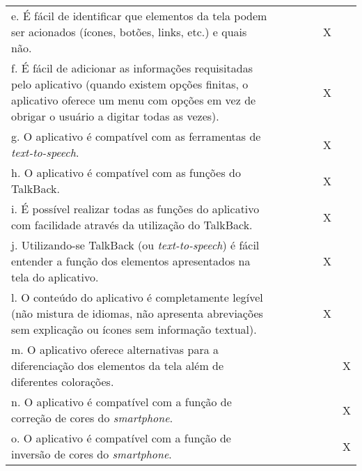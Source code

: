 \documentclass[portuguese,oneside]{tcc}
\begin{document}
\begin{center}
\begin{longtabu}{|L{25em}|c|c|c|c|c|c|}
	e. É fácil de identificar que elementos da tela podem ser acionados (ícones, botões, links, etc.) e quais não. & & & & & X & \\ 
	f. É fácil de adicionar as informações requisitadas pelo aplicativo (quando existem opções finitas, o aplicativo oferece um menu com opções em vez de obrigar o usuário a digitar todas as vezes). & & & & & X & \\ 
	g. O aplicativo é compatível com as ferramentas de \emph{text-to-speech}. & & & & & X & \\ 
	h. O aplicativo é compatível com as funções do TalkBack. & & & & & X & \\ 
	i. É possível realizar todas as funções do aplicativo com facilidade através da utilização do TalkBack.	& & & & & X & \\ 
	j. Utilizando-se TalkBack (ou \emph{text-to-speech}) é fácil entender a função dos elementos apresentados na tela do aplicativo. & & & & & X & \\ 
	l. O conteúdo do aplicativo é completamente legível (não mistura de idiomas, não apresenta abreviações sem explicação ou ícones sem informação textual). & & & & & X & \\ 
	m. O aplicativo oferece alternativas para a diferenciação dos elementos da tela além de diferentes colorações. & & & & & & X \\ 
	n. O aplicativo é compatível com a função de correção de cores do \emph{smartphone}. & & & & & & X \\ 
	o. O aplicativo é compatível com a função de inversão de cores do \emph{smartphone}. & & & & & & X \\ 
\end{longtabu}
\end{center}
\end{document}
